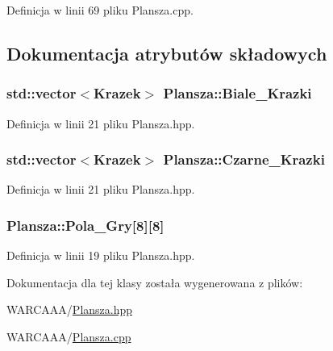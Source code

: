 Definicja w linii 69 pliku Plansza.\-cpp.



\subsection{Dokumentacja atrybutów składowych}
\hypertarget{class_plansza_a74a767eded54ce5fd06215b9e195ff0b}{
\subsubsection[{Biale\-\_\-\-Krazki}]{\setlength{\rightskip}{0pt plus 5cm}std\-::vector$<${\bf Krazek}$>$ Plansza\-::\-Biale\-\_\-\-Krazki}}\label{class_plansza_a74a767eded54ce5fd06215b9e195ff0b}


Definicja w linii 21 pliku Plansza.\-hpp.

\hypertarget{class_plansza_a8ac386cacff9484384c29eae2ea3b965}{
\subsubsection[{Czarne\-\_\-\-Krazki}]{\setlength{\rightskip}{0pt plus 5cm}std\-::vector$<${\bf Krazek}$>$ Plansza\-::\-Czarne\-\_\-\-Krazki}}\label{class_plansza_a8ac386cacff9484384c29eae2ea3b965}


Definicja w linii 21 pliku Plansza.\-hpp.

\hypertarget{class_plansza_af3bfb2efbb517325909ed2b4da05cb19}{
\subsubsection[{Pola\-\_\-\-Gry}]{ Plansza\-::\-Pola\-\_\-\-Gry\mbox{[}8\mbox{]}\mbox{[}8\mbox{]}}}\label{class_plansza_af3bfb2efbb517325909ed2b4da05cb19}


Definicja w linii 19 pliku Plansza.\-hpp.



Dokumentacja dla tej klasy została wygenerowana z plików\-:\begin{DoxyCompactItemize}
\item 
W\-A\-R\-C\-A\-A\-A/\hyperlink{_plansza_8hpp}{Plansza.\-hpp}\item 
W\-A\-R\-C\-A\-A\-A/\hyperlink{_plansza_8cpp}{Plansza.\-cpp}\end{DoxyCompactItemize}
